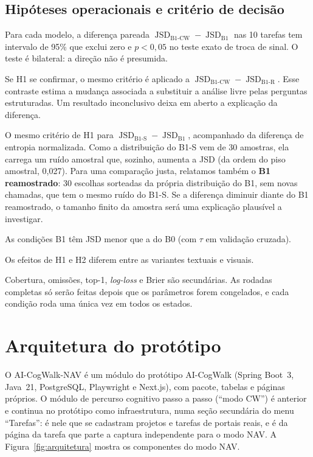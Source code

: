 \documentclass[12pt]{article}
\newcommand{\proj}{AI-CogWalk-NAV}
\DeclareMathOperator{\JSD}{JSD}
\begin{document}
\subsection{Hipóteses operacionais e critério de decisão}

\begin{description}[leftmargin=0.9cm,style=nextline]
\item[H1 (principal)] Para cada modelo, a diferença pareada $\JSD_{\text{B1-CW}}-\JSD_{\text{B1}}$ nas 10 tarefas tem intervalo de 95\% que exclui zero e $p<0{,}05$ no teste exato de troca de sinal. O teste é bilateral: a direção não é presumida.
\item[H1a (atribuição)] Se H1 se confirmar, o mesmo critério é aplicado a $\JSD_{\text{B1-CW}}-\JSD_{\text{B1-R}}$. Esse contraste estima a mudança associada a substituir a análise livre pelas perguntas estruturadas. Um resultado inconclusivo deixa em aberto a explicação da diferença.
\item[H2] O mesmo critério de H1 para $\JSD_{\text{B1-S}}-\JSD_{\text{B1}}$, acompanhado da diferença de entropia normalizada. Como a distribuição do B1-S vem de 30 amostras, ela carrega um ruído amostral que, sozinho, aumenta a JSD (da ordem do piso amostral, 0,027). Para uma comparação justa, relatamos também o \textbf{B1 reamostrado}: 30 escolhas sorteadas da própria distribuição do B1, sem novas chamadas, que tem o mesmo ruído do B1-S. Se a diferença diminuir diante do B1 reamostrado, o tamanho finito da amostra será uma explicação plausível a investigar.
\item[H3] As condições B1 têm JSD menor que a do B0 (com $\tau$ em validação cruzada).
\item[H4 (exploratória)] Os efeitos de H1 e H2 diferem entre as variantes textuais e visuais.
\end{description}
Cobertura, omissões, top-1, \textit{log-loss} e Brier são secundárias. As rodadas completas só serão feitas depois que os parâmetros forem congelados, e cada condição roda uma única vez em todos os estados.

\section{Arquitetura do protótipo}
\label{sec:arquitetura}

O \proj{} é um módulo do protótipo AI-CogWalk (Spring Boot~3, Java~21, PostgreSQL, Playwright e Next.js), com pacote, tabelas e páginas próprios. O módulo de percurso cognitivo passo a passo (``modo CW'') é anterior e continua no protótipo como infraestrutura, numa seção secundária do menu ``Tarefas'': é nele que se cadastram projetos e tarefas de portais reais, e é da página da tarefa que parte a captura independente para o modo NAV. A Figura~\ref{fig:arquitetura} mostra os componentes do modo NAV.
\end{document}
